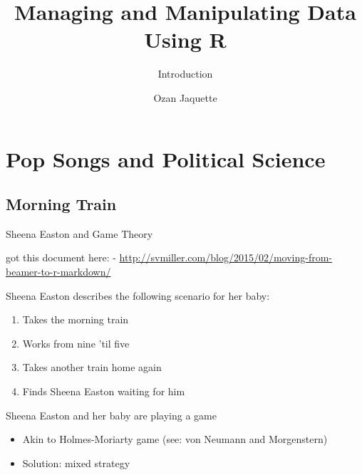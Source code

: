 \documentclass[ignorenonframetext,]{beamer}
\institute{Department of Education}
\title{Managing and Manipulating Data Using R}
\subtitle{Introduction}
\author{Ozan Jaquette}
\date{}
\providecommand{\tightlist}{%
  \setlength{\itemsep}{0pt}\setlength{\parskip}{0pt}}
\begin{document}
\frame{\titlepage}

\begin{frame}
\tableofcontents[hideallsubsections]
\end{frame}

\section{Pop Songs and Political
Science}\label{pop-songs-and-political-science}

\subsection{Morning Train}\label{morning-train}

\begin{frame}{Sheena Easton and Game Theory}

got this document here: -
\url{http://svmiller.com/blog/2015/02/moving-from-beamer-to-r-markdown/}

\medskip Sheena Easton describes the following scenario for her baby:

\begin{enumerate}
\def\labelenumi{\arabic{enumi}.}
\tightlist
\item
  Takes the morning train
\item
  Works from nine 'til five
\item
  Takes another train home again
\item
  Finds Sheena Easton waiting for him
\end{enumerate}

\bigskip Sheena Easton and her baby are playing a game

\begin{itemize}
\tightlist
\item
  Akin to Holmes-Moriarty game (see: von Neumann and Morgenstern)
\item
  Solution: mixed strategy
\end{itemize}

\end{frame}
\end{document}

